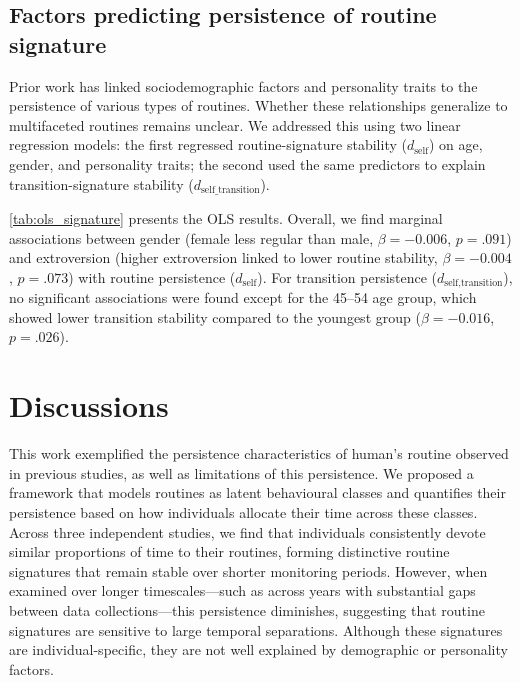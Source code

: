 \documentclass[pdflatex,sn-vancouver,Numbered]{bst/sn-jnl}%
\theoremstyle{thmstyleone}%
\theoremstyle{thmstyletwo}%
\theoremstyle{thmstylethree}%
\begin{document}
\subsection*{Factors predicting persistence of routine signature}\label{sec3.3}

Prior work has linked sociodemographic factors \cite{luong2023impact, luong2024sleep, kulshrestha2021web} and personality traits \cite{centellegherPersonalityTraitsEgonetwork2017, alessandrettiUnderstandingInterplaySocial2018, amon2022flexibility} to the persistence of various types of routines.  Whether these relationships generalize to multifaceted routines remains unclear. We addressed this using two linear regression models: the first regressed routine-signature stability ($d_{\text{self}}$) on age, gender, and personality traits; the second used the same predictors to explain transition-signature stability ($d_{\text{self\_transition}}$). 




\autoref{tab:ols_signature} presents the OLS results. Overall, we find marginal associations between gender (female less regular than male, $\beta=-0.006$, $p=.091$) and extroversion (higher extroversion linked to lower routine stability, $\beta=-0.004$, $p=.073$) with routine persistence ($d_{\text{self}}$). For transition persistence ($d_{\text{self,transition}}$), no significant associations were found except for the 45--54 age group, which showed lower transition stability compared to the youngest group ($\beta=-0.016$, $p=.026$).

\section*{Discussions}\label{sec4}  

This work exemplified the persistence characteristics of human's routine observed in previous studies, as well as limitations of this persistence. We proposed a framework that models routines as latent behavioural classes and quantifies their persistence based on how individuals allocate their time across these classes. Across three independent studies, we find that individuals consistently devote similar proportions of time to their routines, forming distinctive routine signatures that remain stable over shorter monitoring periods. However, when examined over longer timescales—such as across years with substantial gaps between data collections—this persistence diminishes, suggesting that routine signatures are sensitive to large temporal separations. Although these signatures are individual-specific, they are not well explained by demographic or personality factors.
\end{document}
